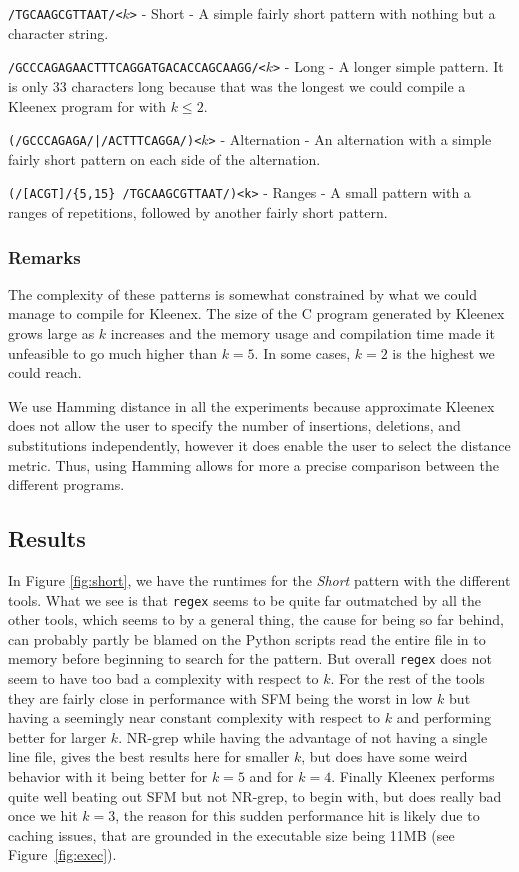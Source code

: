 \texttt{/TGCAAGCGTTAAT/<$k$>} - Short - A simple fairly short pattern with
nothing but a character string.

\texttt{/GCCCAGAGAACTTTCAGGATGACACCAGCAAGG/<$k$>} - Long - A longer simple
pattern. It is only 33 characters long because that was the longest we could
compile a Kleenex program for with $k \leq 2$.

\texttt{(/GCCCAGAGA/|/ACTTTCAGGA/)<$k$>} - Alternation - An alternation with a
simple fairly short pattern on each side of the alternation.

\texttt{(/[ACGT]/\{5,15\} /TGCAAGCGTTAAT/)<k>} - Ranges - A small pattern with
a ranges of repetitions, followed by another fairly short pattern.


\subsubsection{Remarks}
The complexity of these patterns is somewhat constrained by what we could
manage to compile for Kleenex. The size of the C program generated by Kleenex
grows large as $k$ increases and the memory usage and compilation time made it
unfeasible to go much higher than $k=5$. In some cases, $k=2$ is the highest we
could reach.

We use Hamming distance in all the experiments because approximate Kleenex does
not allow the user to specify the number of insertions, deletions, and
substitutions independently, however it does enable the user to select the
distance metric. Thus, using Hamming allows for more a precise comparison
between the different programs.


\subsection{Results}
In Figure \ref{fig:short}, we have the runtimes for the \textit{Short} pattern
with the different tools. What we see is that \texttt{regex} seems to be quite
far outmatched by all the other tools, which seems to by a general thing, the
cause for being so far behind, can probably partly be blamed on the Python
scripts read the entire file in to memory before beginning to search for the
pattern. But overall \texttt{regex} does not seem to have too bad a complexity
with respect to $k$. For the rest of the tools they are fairly close in
performance with SFM being the worst in low $k$ but having a seemingly near
constant complexity with respect to $k$ and performing better for larger $k$.
NR-grep while having the advantage of not having a single line file, gives the
best results here for smaller $k$, but does have some weird behavior with it
being better for $k=5$ and for $k=4$. Finally Kleenex performs quite well
beating out SFM but not NR-grep, to begin with, but does really bad once we hit
$k=3$, the reason for this sudden performance hit is likely due to caching
issues, that are grounded in the executable size being 11MB (see
Figure~\ref{fig:exec}).

